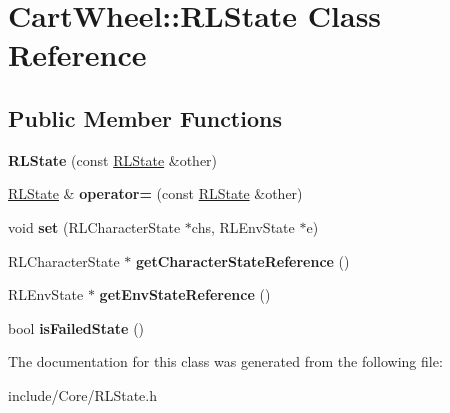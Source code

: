\hypertarget{classCartWheel_1_1RLState}{
\section{CartWheel::RLState Class Reference}
\label{classCartWheel_1_1RLState}
}
\subsection*{Public Member Functions}
\begin{DoxyCompactItemize}
\item 
\hypertarget{classCartWheel_1_1RLState_a8fb4ed0ba3f14280d452f26a1760bb09}{
{\bfseries RLState} (const \hyperlink{classCartWheel_1_1RLState}{RLState} \&other)}
\label{classCartWheel_1_1RLState_a8fb4ed0ba3f14280d452f26a1760bb09}

\item 
\hypertarget{classCartWheel_1_1RLState_af195e2c3c2bd1df6b7e74d4eefae4a96}{
\hyperlink{classCartWheel_1_1RLState}{RLState} \& {\bfseries operator=} (const \hyperlink{classCartWheel_1_1RLState}{RLState} \&other)}
\label{classCartWheel_1_1RLState_af195e2c3c2bd1df6b7e74d4eefae4a96}

\item 
\hypertarget{classCartWheel_1_1RLState_a5a43debf1b9bc2b65c6bd8be9560d412}{
void {\bfseries set} (RLCharacterState $\ast$chs, RLEnvState $\ast$e)}
\label{classCartWheel_1_1RLState_a5a43debf1b9bc2b65c6bd8be9560d412}

\item 
\hypertarget{classCartWheel_1_1RLState_a88b4272be39c84c42f13943421ea3e37}{
RLCharacterState $\ast$ {\bfseries getCharacterStateReference} ()}
\label{classCartWheel_1_1RLState_a88b4272be39c84c42f13943421ea3e37}

\item 
\hypertarget{classCartWheel_1_1RLState_a657d847e99bef7a553437bac93a5daf0}{
RLEnvState $\ast$ {\bfseries getEnvStateReference} ()}
\label{classCartWheel_1_1RLState_a657d847e99bef7a553437bac93a5daf0}

\item 
\hypertarget{classCartWheel_1_1RLState_ab1ce1ef276e5ad865be024d673c07629}{
bool {\bfseries isFailedState} ()}
\label{classCartWheel_1_1RLState_ab1ce1ef276e5ad865be024d673c07629}

\end{DoxyCompactItemize}


The documentation for this class was generated from the following file:\begin{DoxyCompactItemize}
\item 
include/Core/RLState.h\end{DoxyCompactItemize}
